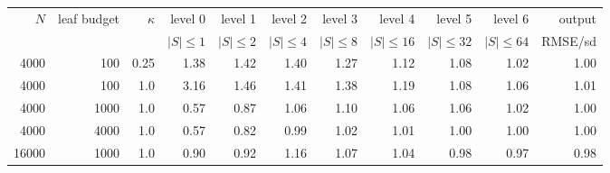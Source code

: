 \begin{tabular}{@{}rrrrrrrrrrr@{}}\toprule
$N$ & leaf budget & $\kappa$ & level 0 & level 1 & level 2 & level 3 & level 4 & level 5 & level 6 & output\\
 & & & $|S|{\le}1$ & $|S|{\le}2$ & $|S|{\le}4$ & $|S|{\le}8$ & $|S|{\le}16$ & $|S|{\le}32$ & $|S|{\le}64$ & RMSE/sd\\\midrule
4000 & 100 & 0.25 & 1.38 & 1.42 & 1.40 & 1.27 & 1.12 & 1.08 & 1.02 & 1.00\\
4000 & 100 & 1.0 & 3.16 & 1.46 & 1.41 & 1.38 & 1.19 & 1.08 & 1.06 & 1.01\\
4000 & 1000 & 1.0 & 0.57 & 0.87 & 1.06 & 1.10 & 1.06 & 1.06 & 1.02 & 1.00\\
4000 & 4000 & 1.0 & 0.57 & 0.82 & 0.99 & 1.02 & 1.01 & 1.00 & 1.00 & 1.00\\
16000 & 1000 & 1.0 & 0.90 & 0.92 & 1.16 & 1.07 & 1.04 & 0.98 & 0.97 & 0.98\\
\bottomrule\end{tabular}